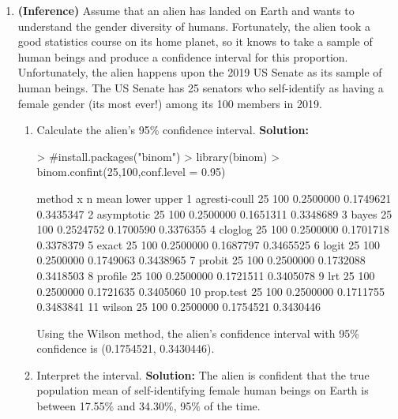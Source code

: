 \documentclass{article}
\begin{document}
\begin{enumerate}
\newpage
\item \textbf{(Inference)} Assume that an alien has landed on Earth and wants to understand the gender diversity of humans.
Fortunately, the alien took a good statistics course on its home planet, so it knows to take a sample 
of human beings and produce a confidence interval for this proportion.  Unfortunately, the alien happens 
upon the 2019 US Senate as its sample of human beings.  The US Senate has 25 senators who self-identify as 
having a female gender (its most ever!) among its 100 members in 2019.
\begin{enumerate}
\item Calculate the alien's 95\% confidence interval.
\newline
\textbf{Solution:}
\begin{Schunk}
\begin{Sinput}
> #install.packages("binom")
> library(binom)
> binom.confint(25,100,conf.level = 0.95)
\end{Sinput}
\begin{Soutput}
          method  x   n      mean     lower     upper
1  agresti-coull 25 100 0.2500000 0.1749621 0.3435347
2     asymptotic 25 100 0.2500000 0.1651311 0.3348689
3          bayes 25 100 0.2524752 0.1700590 0.3376355
4        cloglog 25 100 0.2500000 0.1701718 0.3378379
5          exact 25 100 0.2500000 0.1687797 0.3465525
6          logit 25 100 0.2500000 0.1749063 0.3438965
7         probit 25 100 0.2500000 0.1732088 0.3418503
8        profile 25 100 0.2500000 0.1721511 0.3405078
9            lrt 25 100 0.2500000 0.1721635 0.3405060
10     prop.test 25 100 0.2500000 0.1711755 0.3483841
11        wilson 25 100 0.2500000 0.1754521 0.3430446
\end{Soutput}
\end{Schunk}
\cite{binom}
\newline
Using the Wilson method, the alien's confidence interval with 95\% confidence is (0.1754521, 0.3430446).
\item Interpret the interval.
\newline
\textbf{Solution:}
\newline
The alien is confident that the true population mean of self-identifying female human beings on Earth is between 17.55\% and 34.30\%, 95\% of the time. 

\end{enumerate}
\end{enumerate}
\end{document}
